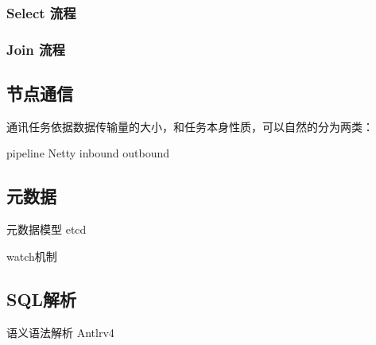 \documentclass[a4paper, 12pt]{ctexart}
\begin{document}
\subsubsection{Select 流程}


\subsubsection{Join 流程}



\subsection{节点通信}
通讯任务依据数据传输量的大小，和任务本身性质，可以自然的分为两类：


pipeline  Netty inbound outbound



\subsection{元数据}
元数据模型  etcd   


watch机制



\subsection{SQL解析}
语义语法解析
Antlrv4
\end{document}
